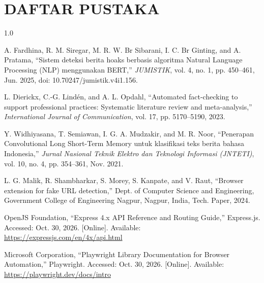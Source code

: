 \documentclass[12pt,a4paper,twoside]{report}
\begin{document}
\clearpage
{}
{}
\chapter*{DAFTAR PUSTAKA}

\begingroup
\begin{spacing}{1.0}
\begin{enumerate}[label={[\arabic*]},leftmargin=0.9cm,itemsep=5pt,topsep=2pt]
  \item A. Fardhina, R. M. Siregar, M. R. W. Br Sibarani, I. C. Br Ginting, and A. Pratama, ``Sistem deteksi berita hoaks berbasis algoritma Natural Language Processing (NLP) menggunakan BERT,'' \textit{JUMISTIK}, vol. 4, no. 1, pp. 450--461, Jun. 2025, doi: 10.70247/jumistik.v4i1.156.

  \item L. Dierickx, C.-G. Lind\'{e}n, and A. L. Opdahl, ``Automated fact-checking to support professional practices: Systematic literature review and meta-analysis,'' \textit{International Journal of Communication}, vol. 17, pp. 5170--5190, 2023.

  \item Y. Widhiyasana, T. Semiawan, I. G. A. Mudzakir, and M. R. Noor, ``Penerapan Convolutional Long Short-Term Memory untuk klasifikasi teks berita bahasa Indonesia,'' \textit{Jurnal Nasional Teknik Elektro dan Teknologi Informasi (JNTETI)}, vol. 10, no. 4, pp. 354--361, Nov. 2021.

  \item L. G. Malik, R. Shambharkar, S. Morey, S. Kanpate, and V. Raut, ``Browser extension for fake URL detection,'' Dept. of Computer Science and Engineering, Government College of Engineering Nagpur, Nagpur, India, Tech. Paper, 2024.

  \item OpenJS Foundation, ``Express 4.x API Reference and Routing Guide,'' Express.js. Accessed: Oct. 30, 2026. [Online]. Available: \url{https://expressjs.com/en/4x/api.html}

  \item Microsoft Corporation, ``Playwright Library Documentation for Browser Automation,'' Playwright. Accessed: Oct. 30, 2026. [Online]. Available: \url{https://playwright.dev/docs/intro}


\end{enumerate}
\end{spacing}
\end{document}

